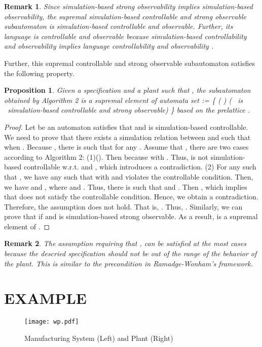 \documentclass[12pt,draftcls,onecolumn]{IEEEtran}
\newtheorem{Proposition}{Proposition}
\newtheorem{Remark}{Remark}
\begin{document}
\begin{Remark}
Since simulation-based strong observability implies
simulation-based observability, the supremal simulation-based
controllable and strong observable subautomaton is
simulation-based controllable and observable. Further, its
language is controllable and observable because simulation-based
controllability and observability implies language controllability
and observability \cite{liu}.
\end{Remark}


Further, this supremal controllable and strong observable
subautomaton satisfies the following property.



\begin{Proposition}\label{supa}
Given a specification  and a
plant  such that , the subautomaton 
obtained by Algorithm 2 is a supremal element of automata set
:= \{ ( )  ( ~is
~simulation-based controllable and strong observable) \} based on
the prelattice .
\end{Proposition}

\begin{proof}
Let  be an automaton
satisfies that  and  is simulation-based
controllable. We need to prove that there exists a simulation
relation  between  and  such that  when . Because
, there is  such
that  for any . Assume that , there are two cases
according to Algorithm 2: (1)(). Then  because  with
. Thus,  is not
simulation-based controllable w.r.t.  and , which
introduces a contradiction. (2) For any  such that , we have any  such that
 with  and  violates the
controllable condition. Then, we have  and , where  and
. Thus, there is 
such that  and . Then , which implies
that  does not satisfy the controllable condition. Hence, we
obtain a contradiction. Therefore, the assumption does not hold.
That is, . Thus, . Similarly, we can
prove that  if  and  is
simulation-based strong observable. As a result,  is a
supremal element of .
\end{proof}

\begin{Remark}
The assumption requiring that , can be satisfied
at the most cases because the descried specification should not be
out of the range of the behavior of the plant. This is similar to
the precondition  in Ramadge-Wonham's
framework.
\end{Remark}




\section{EXAMPLE}
\begin{figure}[!htb]
\begin{center}
\texttt{[image: wp.pdf]}
\caption{Manufacturing System (Left) and Plant (Right)} \label{all3}
\end{center}
\end{figure}
\end{document}
